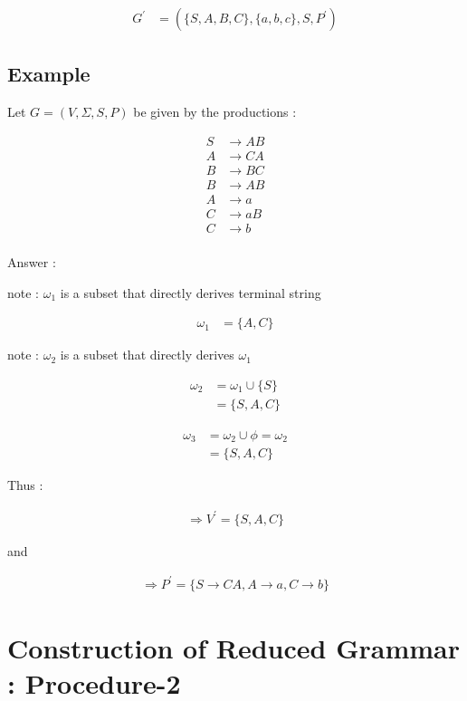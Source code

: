 \documentclass[12pt]{book}
\begin{document}
\begin{align*}
G^{\prime} &= ( \{ S, A, B, C \} , \{ a, b, c \} , S,  P^{\prime} )
\end{align*}



\subsection{Example}

Let $G = (V, \Sigma, S, P)$ be given by the productions :

\begin{align*}
S &\to AB \\
A &\to CA \\
B &\to BC \\
B &\to AB \\
A &\to a \\
C &\to aB \\
C &\to b \\
\end{align*}

Answer :

note : $\omega_{1}$ is a subset that directly derives terminal string

\begin{align*}
\omega_{1} &= \{ A, C \} 
\end{align*}

note : $\omega_{2}$ is a subset that directly derives $\omega_{1}$

\begin{align*}
\omega_{2} &= \omega_{1} \cup \{ S \} \\
&= \{ S, A, C \} 
\end{align*}

\begin{align*}
\omega_{3} &= \omega_{2} \cup \phi = \omega_{2} \\
&= \{ S, A, C \} 
\end{align*}

Thus :

\begin{align*}
\Rightarrow V^{\prime} = \{ S, A, C \}
\end{align*}

and 

\begin{align*}
\Rightarrow P^{\prime} = \{ S \to CA, A \to a, C \to b \}
\end{align*}

\section{Construction of Reduced Grammar : Procedure-2}
\end{document}
